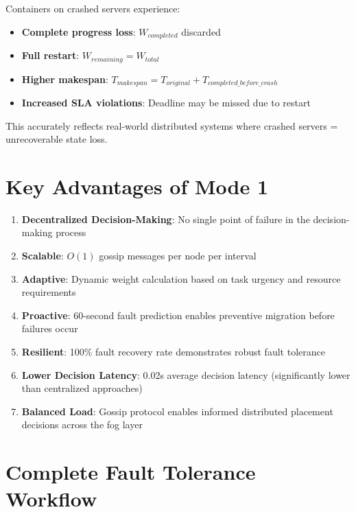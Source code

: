 \documentclass[12pt,a4paper]{article}
\begin{document}
Containers on crashed servers experience:
\begin{itemize}
    \item \textbf{Complete progress loss}: $W_{completed}$ discarded
    \item \textbf{Full restart}: $W_{remaining} = W_{total}$
    \item \textbf{Higher makespan}: $T_{makespan} = T_{original} + T_{completed\_before\_crash}$
    \item \textbf{Increased SLA violations}: Deadline may be missed due to restart
\end{itemize}

This accurately reflects real-world distributed systems where crashed servers = unrecoverable state loss.

\section{Key Advantages of Mode 1}

\begin{enumerate}
    \item \textbf{Decentralized Decision-Making}: No single point of failure in the decision-making process
    \item \textbf{Scalable}: $O(1)$ gossip messages per node per interval
    \item \textbf{Adaptive}: Dynamic weight calculation based on task urgency and resource requirements
    \item \textbf{Proactive}: 60-second fault prediction enables preventive migration before failures occur
    \item \textbf{Resilient}: 100\% fault recovery rate demonstrates robust fault tolerance
    \item \textbf{Lower Decision Latency}: 0.02s average decision latency (significantly lower than centralized approaches)
    \item \textbf{Balanced Load}: Gossip protocol enables informed distributed placement decisions across the fog layer
\end{enumerate}

\section{Complete Fault Tolerance Workflow}
\end{document}
